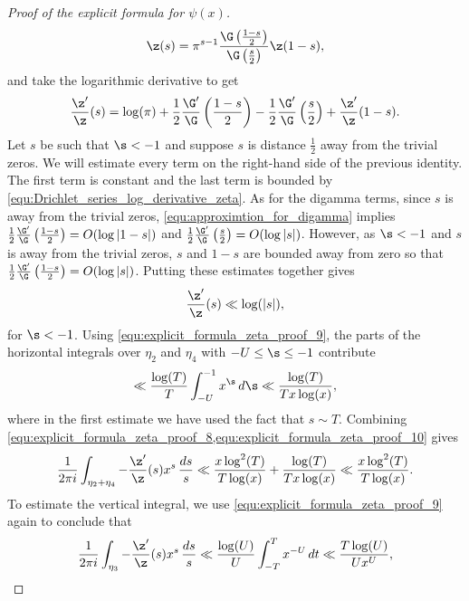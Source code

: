 \begin{proof}[Proof of the explicit formula for $\psi(x)$]
        \[
          \z(s) = \pi^{s-1}\frac{\G\left(\frac{1-s}{2}\right)}{\G\left(\frac{s}{2}\right)}\z(1-s),
        \]
        and take the logarithmic derivative to get
        \[
          \frac{\z'}{\z}(s) = \log(\pi)+\frac{1}{2}\frac{\G'}{\G}\left(\frac{1-s}{2}\right)-\frac{1}{2}\frac{\G'}{\G}\left(\frac{s}{2}\right)+\frac{\z'}{\z}(1-s).
        \]
        Let $s$ be such that $\s < -1$ and suppose $s$ is distance $\frac{1}{2}$ away from the trivial zeros. We will estimate every term on the right-hand side of the previous identity. The first term is constant and the last term is bounded by \cref{equ:Drichlet_series_log_derivative_zeta}. As for the digamma terms, since $s$ is away from the trivial zeros, \cref{equ:approximtion_for_digamma} implies $\frac{1}{2}\frac{\G'}{\G}\left(\frac{1-s}{2}\right) = O(\log|1-s|)$ and $\frac{1}{2}\frac{\G'}{\G}\left(\frac{s}{2}\right) = O(\log|s|)$. However, as $\s < -1$ and $s$ is away from the trivial zeros, $s$ and $1-s$ are bounded away from zero so that $\frac{1}{2}\frac{\G'}{\G}\left(\frac{1-s}{2}\right) = O(\log|s|)$. Putting these estimates together gives
        \begin{equation}\label{equ:explicit_formula_zeta_proof_9}
          \frac{\z'}{\z}(s) \ll \log(|s|),
        \end{equation}
        for $\s < -1$. Using \cref{equ:explicit_formula_zeta_proof_9}, the parts of the horizontal integrals over $\eta_{2}$ and $\eta_{4}$ with $-U \le \s \le -1$ contribute
        \begin{equation}\label{equ:explicit_formula_zeta_proof_10}
          \ll \frac{\log(T)}{T}\int_{-U}^{-1}x^{\s}\,d\s \ll \frac{\log(T)}{Tx\log(x)},
        \end{equation}
        where in the first estimate we have used the fact that $s \sim T$. Combining \cref{equ:explicit_formula_zeta_proof_8,equ:explicit_formula_zeta_proof_10} gives
        \begin{equation}\label{equ:explicit_formula_zeta_proof_11}
          \frac{1}{2\pi i}\int_{\eta_{2}+\eta_{4}}-\frac{\z'}{\z}(s)x^{s}\,\frac{ds}{s} \ll \frac{x\log^{2}(T)}{T\log(x)}+\frac{\log(T)}{Tx\log(x)} \ll \frac{x\log^{2}(T)}{T\log(x)}.
        \end{equation}
        To estimate the vertical integral, we use \cref{equ:explicit_formula_zeta_proof_9} again to conclude that
        \begin{equation}\label{equ:explicit_formula_zeta_proof_12}
          \frac{1}{2\pi i}\int_{\eta_{3}}-\frac{\z'}{\z}(s)x^{s}\,\frac{ds}{s} \ll \frac{\log(U)}{U}\int_{-T}^{T}x^{-U}\,dt \ll \frac{T\log(U)}{Ux^{U}},

\end{equation}
\end{proof}
